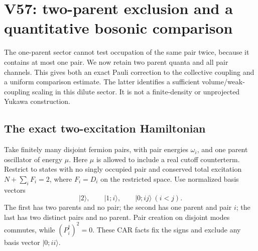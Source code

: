\documentclass[11pt]{article}
\theoremstyle{remark}
\begin{document}
\section{V57: two-parent exclusion and a quantitative bosonic comparison}
\label{sec:v20v57}

The one-parent sector cannot test occupation of the same pair
twice, because it contains at most one pair.  We now retain two
parent quanta and all pair channels.  This gives both an exact
Pauli correction to the collective coupling and a uniform
comparison estimate.  The latter identifies a sufficient
volume/weak-coupling scaling in this dilute sector.
It is not a finite-density or unprojected Yukawa construction.

\subsection{The exact two-excitation Hamiltonian}

Take finitely many disjoint fermion pairs, with pair energies
\(\omega_i\), and one parent oscillator of energy \(\mu\).
Here \(\mu\) is allowed to include a real cutoff counterterm.
Restrict to states with no singly occupied pair and conserved
total excitation \(N+\sum_iF_i=2\), where \(F_i=D_i\)
on the restricted space.  Use normalized basis vectors
\[
 |2\rangle,\qquad |1;i\rangle,\qquad |0;ij\rangle\ (i<j).
\]
The first has two parents and no pair; the second has one parent
and pair \(i\); the last has two distinct pairs and no parent.
Pair creation on disjoint modes commutes, while
\((P_i^\dagger)^2=0\).  These CAR facts fix the signs and exclude
any basis vector \(|0;ii\rangle\).
\end{document}
